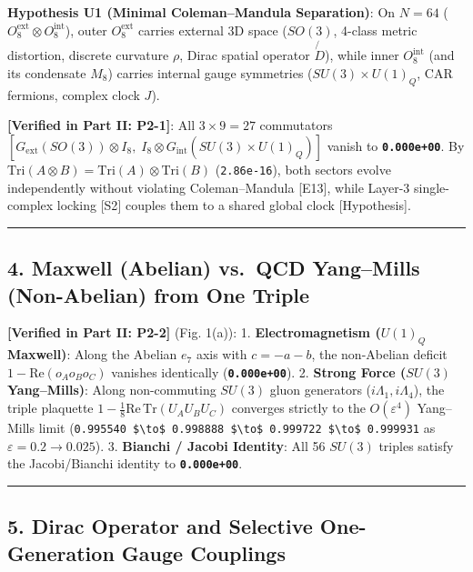 \documentclass[
  a4paper,
]{article}
\begin{document}
\textbf{Hypothesis U1 (Minimal Coleman--Mandula Separation)}: On
\(N = 64\) (\(O_8^{\mathrm{ext}} \otimes O_8^{\mathrm{int}}\)), outer
\(O_8^{\mathrm{ext}}\) carries external 3D space (\(SO(3)\), 4-class
metric distortion, discrete curvature \(\rho\), Dirac spatial operator
\(\not{D}\)), while inner \(O_8^{\mathrm{int}}\) (and its condensate
\(M_8\)) carries internal gauge symmetries (\(SU(3)\times U(1)_Q\), CAR
fermions, complex clock \(J\)).

\textbf{{[}Verified in Part II: P2-1{]}}: All \(3 \times 9 = 27\)
commutators
\([G_{\mathrm{ext}}(SO(3))\otimes I_8,\; I_8\otimes G_{\mathrm{int}}(SU(3)\times U(1)_Q)]\)
vanish to \textbf{\texttt{0.000e+00}}. By
\(\mathrm{Tri}(A\otimes B) = \mathrm{Tri}(A)\otimes\mathrm{Tri}(B)\)
(\texttt{2.86e-16}), both sectors evolve independently without violating
Coleman--Mandula {[}E13{]}, while Layer-3 single-complex locking
{[}S2{]} couples them to a shared global clock {[}Hypothesis{]}.

\begin{center}\rule{0.5\linewidth}{0.5pt}\end{center}

\subsection{4. Maxwell (Abelian) vs.~QCD Yang--Mills (Non-Abelian) from
One
Triple}\label{maxwell-abelian-vs.-qcd-yangmills-non-abelian-from-one-triple}

\textbf{{[}Verified in Part II: P2-2{]}} (Fig. 1(a)): 1.
\textbf{Electromagnetism (\(U(1)_Q\) Maxwell)}: Along the Abelian
\(e_7\) axis with \(c = -a-b\), the non-Abelian deficit
\(1 - \mathrm{Re}(o_A o_B o_C)\) vanishes identically
(\textbf{\texttt{0.000e+00}}). 2. \textbf{Strong Force (\(SU(3)\)
Yang--Mills)}: Along non-commuting \(SU(3)\) gluon generators
(\(i\Lambda_1, i\Lambda_4\)), the triple plaquette
\(1 - \frac{1}{8}\mathrm{Re}\,\mathrm{Tr}(U_A U_B U_C)\) converges
strictly to the \(O(\varepsilon^4)\) Yang--Mills limit
(\texttt{0.995540\ \$\textbackslash{}to\$\ 0.998888\ \$\textbackslash{}to\$\ 0.999722\ \$\textbackslash{}to\$\ 0.999931}
as \(\varepsilon = 0.2 \to 0.025\)). 3. \textbf{Bianchi / Jacobi
Identity}: All 56 \(SU(3)\) triples satisfy the Jacobi/Bianchi identity
to \textbf{\texttt{0.000e+00}}.

\begin{center}\rule{0.5\linewidth}{0.5pt}\end{center}

\subsection{5. Dirac Operator and Selective One-Generation Gauge
Couplings}\label{dirac-operator-and-selective-one-generation-gauge-couplings}
\end{document}
